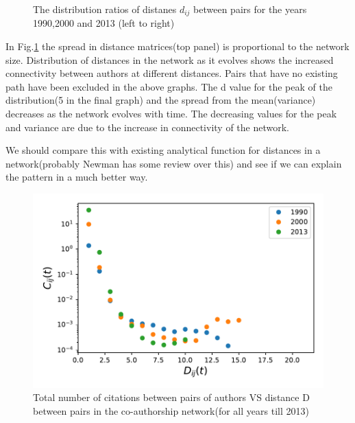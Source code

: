 \documentclass[aps, pre, twocolumn, nofootinbib]{revtex4-1}
\begin{document}
\begin{figure}[htbp]
  \captionsetup{singlelinecheck=false, justification=raggedright,  labelsep=space}
  \caption{The distribution ratios of distanes $d_{ij}$ between pairs for the years 1990,2000 and 2013 (left to right)}
  \label{f3}
\end{figure}
In Fig.\ref{f3} the spread in distance matrices(top panel) is proportional to the network size. Distribution of distances in the network as it  evolves shows the increased connectivity between authors at different distances. Pairs that have no existing path have been excluded in the above graphs. The d value for the peak of the distribution(5 in the final graph) and the spread from the mean(variance) decreases as the network evolves with time. The decreasing values for the peak and variance are due to the increase in connectivity of the network. 

{\color{blue}We should compare this with existing analytical function for distances in a network(probably Newman has some review over this) and see if we can explain the pattern in a much better way.}

\begin{figure}
	\centering
	
	\includegraphics[scale = 0.49]{plots/fig1}
	
\captionsetup{singlelinecheck=false, justification=raggedright,  labelsep=space}
\caption{Total number of citations between pairs of authors VS distance D between pairs in the co-authorship network(for all years till 2013)}
   \label{f4}
\end{figure}
\end{document}
